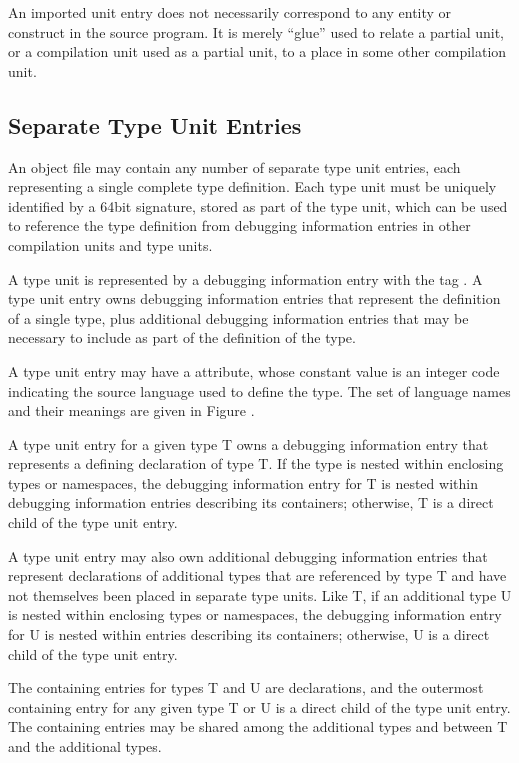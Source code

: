 An imported unit entry does not necessarily correspond to
any entity or construct in the source program. It is merely
“glue” used to relate a partial unit, or a compilation
unit used as a partial unit, to a place in some other
compilation unit.

\subsection{Separate Type Unit Entries}
\label{chap:separatetypeunitentries}
An object file may contain any number of separate type
unit entries, each representing a single complete type
definition. Each type unit must be uniquely identified by
a 64\dash bit signature, stored as part of the type unit, which
can be used to reference the type definition from debugging
information entries in other compilation units and type units.

A type unit is represented by a debugging information entry
with the tag . 
A type unit entry owns debugging
information entries that represent the definition of a single
type, plus additional debugging information entries that may
be necessary to include as part of the definition of the type.

A type unit entry may have a  attribute, whose
constant value is an integer code indicating the source
language used to define the type. The set of language names
and their meanings are given in Figure .

A type unit entry for a given type T owns a debugging
information entry that represents a defining declaration
of type T. If the type is nested within enclosing types or
namespaces, the debugging information entry for T is nested
within debugging information entries describing its containers;
otherwise, T is a direct child of the type unit entry.

A type unit entry may also own additional debugging information
entries that represent declarations of additional types that
are referenced by type T and have not themselves been placed in
separate type units. Like T, if an additional type U is nested
within enclosing types or namespaces, the debugging information
entry for U is nested within entries describing its containers;
otherwise, U is a direct child of the type unit entry.

The containing entries for types T and U are declarations,
and the outermost containing entry for any given type T or
U is a direct child of the type unit entry. The containing
entries may be shared among the additional types and between
T and the additional types.

